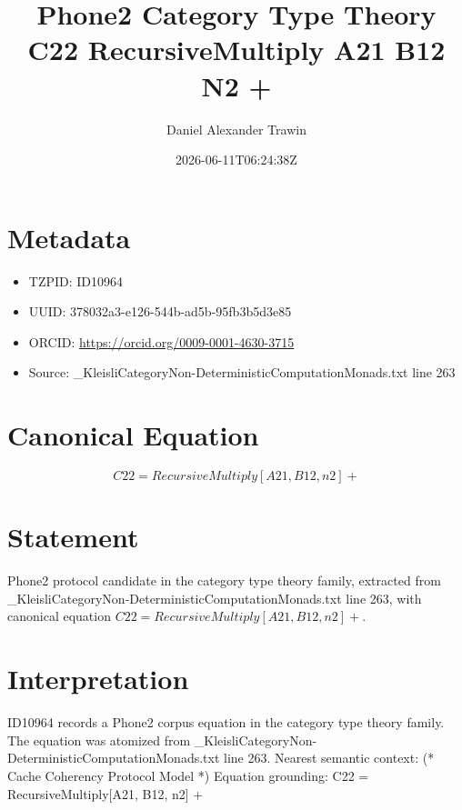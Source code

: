 \documentclass[11pt]{article}
\title{Phone2 Category Type Theory C22 RecursiveMultiply A21 B12 N2 +}
\author{Daniel Alexander Trawin}
\date{2026-06-11T06:24:38Z}
\begin{document}
\maketitle
\section*{Metadata}
\begin{itemize}
\item TZPID: ID10964
\item UUID: 378032a3-e126-544b-ad5b-95fb3b5d3e85
\item ORCID: \url{https://orcid.org/0009-0001-4630-3715}
\item Source: _KleisliCategoryNon-DeterministicComputationMonads.txt line 263
\end{itemize}
\section*{Canonical Equation}
\[
C22 = RecursiveMultiply[A21, B12, n2] +
\]
\section*{Statement}
Phone2 protocol candidate in the category type theory family, extracted from _KleisliCategoryNon-DeterministicComputationMonads.txt line 263, with canonical equation $C22 = RecursiveMultiply[A21, B12, n2] +$.
\section*{Interpretation}
ID10964 records a Phone2 corpus equation in the category type theory family. The equation was atomized from _KleisliCategoryNon-DeterministicComputationMonads.txt line 263. Nearest semantic context: (* Cache Coherency Protocol Model *) Equation grounding: C22 = RecursiveMultiply[A21, B12, n2] +
\end{document}

